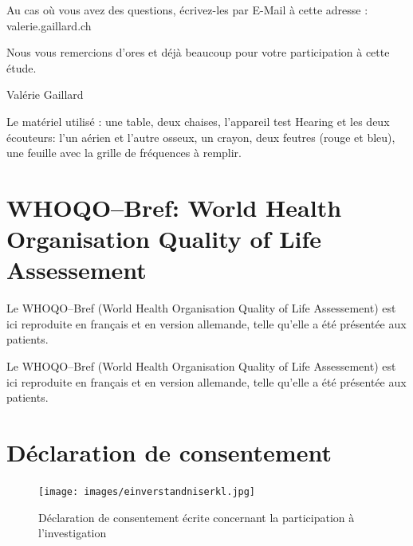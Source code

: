 Au cas où vous avez des questions, écrivez-les par E-Mail à cette adresse : valerie.gaillard\@gmx.ch

Nous vous remercions d'ores et déjà beaucoup pour votre participation
à cette étude.

Valérie Gaillard


\begin{french}
	Le matériel utilisé : une table, deux chaises, l'appareil
	test Hearing et les deux écouteurs: l'un aérien et l'autre osseux, un crayon, deux
	feutres (rouge et bleu), une feuille avec la grille de fréquences à
	remplir.
\end{french}

\chapter{WHOQO--Bref: World Health
   Organisation Quality of Life Assessement}

Le WHOQO--Bref (World Health
   Organisation Quality of Life Assessement) est ici reproduite en
   français et en
   version allemande, telle qu'elle a été présentée aux patients.


Le WHOQO--Bref (World Health
   Organisation Quality of Life Assessement) est ici reproduite en
   français et en
   version allemande, telle qu'elle a été présentée aux patients.

\chapter{Déclaration de consentement}

\begin{figure}
	\centering
	\texttt{[image: images/einverstandniserkl.jpg]}
	\caption{Déclaration de consentement écrite concernant la
          participation à l'investigation}
	\label{fig:déclaration de consentement}
\end{figure}

%
%
%
%
%

